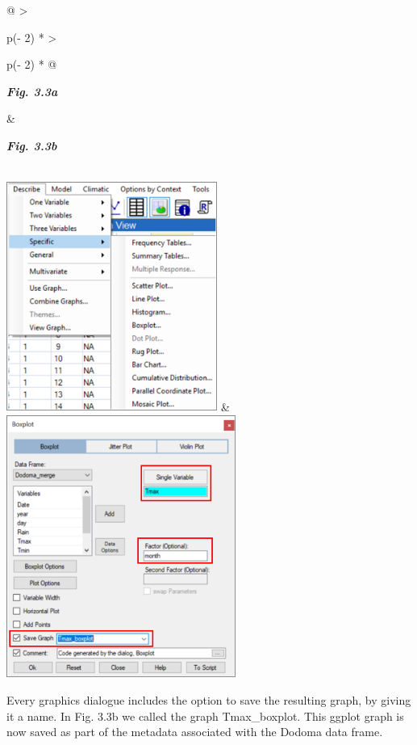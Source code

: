 \documentclass[
  letterpaper,
  DIV=11,
  numbers=noendperiod]{scrreprt}
\begin{document}
\begin{longtable}[]{@{}
  >{\raggedright\arraybackslash}p{(\columnwidth - 2\tabcolsep) * }
  >{\raggedright\arraybackslash}p{(\columnwidth - 2\tabcolsep) * }@{}}
\toprule\noalign{}
\begin{minipage}[b]{\linewidth}\raggedright
\textbf{\emph{Fig. 3.3a}}
\end{minipage} & \begin{minipage}[b]{\linewidth}\raggedright
\textbf{\emph{Fig. 3.3b}}
\end{minipage} \\
\midrule\noalign{}
\endhead
\bottomrule\noalign{}
\endlastfoot
\includegraphics[width=2.72331in,height=2.96851in]{figures/Fig3.3a.png}
&
\includegraphics[width=2.9609in,height=3.38168in]{figures/Fig3.3b.png} \\
\end{longtable}

Every graphics dialogue includes the option to save the resulting graph,
by giving it a name. In Fig. 3.3b we called the graph Tmax\_boxplot.
This ggplot graph is now saved as part of the metadata associated with
the Dodoma data frame.
\end{document}
